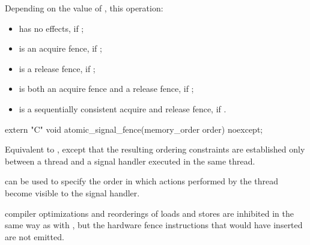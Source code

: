 \begin{itemdescr}
\pnum
\effects Depending on the value of , this operation:

\begin{itemize}
\item has no effects, if ;

\item is an acquire fence, if ;

\item is a release fence, if ;

\item is both an acquire fence and a release fence, if ;

\item is a sequentially consistent acquire and release fence, if .
\end{itemize}
\end{itemdescr}

%
\begin{itemdecl}
extern "C" void atomic_signal_fence(memory_order order) noexcept;
\end{itemdecl}

\begin{itemdescr}
\pnum
\effects Equivalent to , except that
the resulting ordering constraints are established only between a thread and a
signal handler executed in the same thread.

\pnum
\realnote {} can be used to specify the order in which actions
performed by the thread become visible to the signal handler.

\pnum
\realnote compiler optimizations and reorderings of loads and stores are inhibited in
the same way as with , but the hardware fence instructions
that  would have inserted are not emitted.
\end{itemdescr}
